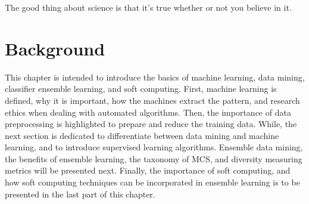 



\begin{savequote}[50mm]
The good thing about science is that it's true whether or not you believe in it. 
\end{savequote}


\chapter{Background}
\label{cha:2_background}

This chapter is intended to introduce the basics of machine learning, data mining, classifier ensemble learning, and soft computing. First, machine learning is defined, why it is important, how the machines extract the pattern, and research ethics when dealing with automated algorithms. Then, the importance of data preprocessing is highlighted to prepare and reduce the training data. While, the next section is dedicated to differentiate between data mining and machine learning, and to introduce supervised learning algorithms. Ensemble data mining, the benefits of ensemble learning, the taxonomy of MCS, and diversity measuring metrics will be presented next. Finally, the importance of soft computing, and how soft computing techniques can be incorporated in ensemble learning is to be presented in the last part of this chapter.          



